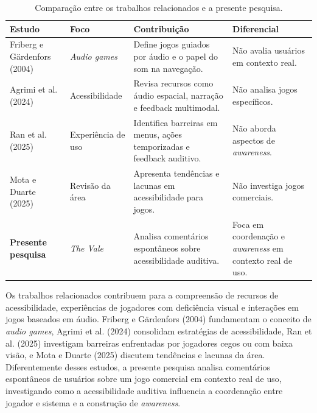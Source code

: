 \documentclass[12pt]{article}
\begin{document}
{{\begin{table}[ht]
\centering
\caption{Comparação entre os trabalhos relacionados e a presente pesquisa.}
\label{tab:relacionados}

\renewcommand{\arraystretch}{1.3}
\footnotesize

\begin{tabular}{p{2.7cm} p{2.1cm} p{4.8cm} p{3.9cm}}
\hline
\textbf{Estudo} & \textbf{Foco} & \textbf{Contribuição} & \textbf{Diferencial} \\
\hline

Friberg e Gärdenfors (2004)
& \textit{Audio games}
& Define jogos guiados por áudio e o papel do som na navegação.
& Não avalia usuários em contexto real. \\

Agrimi et al. (2024)
& Acessibilidade
& Revisa recursos como áudio espacial, narração e feedback multimodal.
& Não analisa jogos específicos. \\

Ran et al. (2025)
& Experiência de uso
& Identifica barreiras em menus, ações temporizadas e feedback auditivo.
& Não aborda aspectos de \textit{awareness}. \\

Mota e Duarte (2025)
& Revisão da área
& Apresenta tendências e lacunas em acessibilidade para jogos.
& Não investiga jogos comerciais. \\

\textbf{Presente pesquisa}
& \textit{The Vale}
& Analisa comentários espontâneos sobre acessibilidade auditiva.
& Foca em coordenação e \textit{awareness} em contexto real de uso. \\

\hline
\end{tabular}
\end{table}

Os trabalhos relacionados contribuem para a compreensão de recursos de acessibilidade, experiências de jogadores com deficiência visual e interações em jogos baseados em áudio. Friberg e Gärdenfors (2004) fundamentam o conceito de \textit{audio games}, Agrimi et al. (2024) consolidam estratégias de acessibilidade, Ran et al. (2025) investigam barreiras enfrentadas por jogadores cegos ou com baixa visão, e Mota e Duarte (2025) discutem tendências e lacunas da área. Diferentemente desses estudos, a presente pesquisa analisa comentários espontâneos de usuários sobre um jogo comercial em contexto real de uso, investigando como a acessibilidade auditiva influencia a coordenação entre jogador e sistema e a construção de \textit{awareness}.


}}
\end{document}

